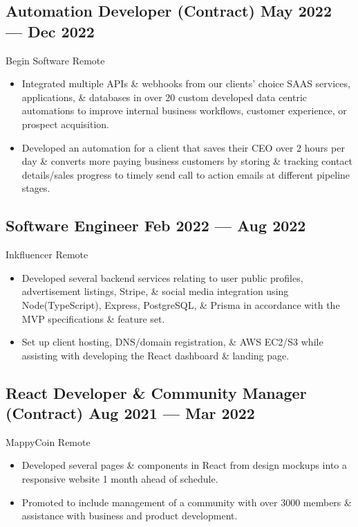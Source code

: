 \documentclass[a4,10pt]{article}
\newcommand{\subtext}[1]{
#1\par\vspace{-0.2cm}}
\newenvironment{zitemize}{
\begin{itemize}\itemsep0pt \parskip0pt \parsep1pt}
{\end{itemize}\vspace{-0.5cm}}
\begin{document}

\subsection*{Automation Developer {\normalsize \normalfont(Contract) } \hfill  May 2022 --- Dec 2022 }
\subtext{Begin Software \hfill Remote }  
    \begin{zitemize}
        \item Integrated multiple APIs \& webhooks from our clients' choice SAAS services, applications, \& databases in over 20 custom developed data centric automations to improve internal business workflows, customer experience, or prospect acquisition.
        \item Developed an automation for a client that saves their CEO over 2 hours per day \& converts more paying business customers by storing \& tracking contact details/sales progress to timely send call to action emails at different pipeline stages.
    \end{zitemize}


\subsection*{Software Engineer {\normalsize \normalfont} \hfill  Feb 2022 --- Aug 2022 }
\subtext{Inkfluencer \hfill Remote }  
    \begin{zitemize}
        \item Developed several backend services relating to user public profiles, advertisement listings, Stripe, \& social media integration using Node(TypeScript), Express, PostgreSQL, \& Prisma in accordance with the MVP specifications \& feature set.
        \item Set up client hosting, DNS/domain registration, \& AWS EC2/S3 while assisting with developing the React dashboard \& landing page.
    \end{zitemize}


\subsection*{React Developer \& Community Manager {\normalsize \normalfont(Contract) } \hfill  Aug 2021 --- Mar 2022 }
\subtext{MappyCoin \hfill Remote } 
    \begin{zitemize}
        \item Developed several pages \& components in React from design mockups into a responsive website 1 month ahead of schedule.
        \item Promoted to include management of a community with over 3000 members \& assistance with business and product development.
    \end{zitemize}
\end{document}
